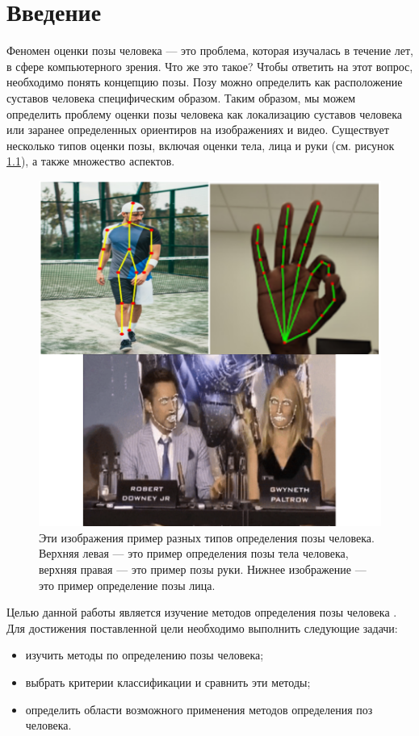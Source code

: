 
\chapter{Введение}


Феномен оценки позы человека --- это проблема, которая изучалась в течение лет, в сфере компьютерного зрения. Что же это такое? Чтобы ответить на этот вопрос, необходимо понять концепцию позы. Позу можно определить как расположение суставов человека специфическим образом. Таким образом, мы можем определить проблему оценки позы человека как локализацию суставов человека или заранее определенных ориентиров на изображениях и видео. Существует несколько типов оценки позы, включая оценки тела, лица и руки (см. рисунок \ref{img:human,hand,face}), а также множество аспектов.

\begin{figure}[ht!]
	\centering
	\includegraphics[width=0.96\linewidth]{assets/thefirst.png}
	\caption{Эти изображения пример разных типов определения позы человека. Верхняя левая --- это пример определения позы тела человека, верхняя правая --- это пример позы руки. Нижнее изображение --- это пример определение позы лица.}
	\label{img:human,hand,face}
\end{figure}


Целью данной работы является изучение методов определения позы человека \cite{guide-hpe}. Для достижения поставленной цели необходимо выполнить следующие задачи:
\begin{itemize}
	\item изучить методы по определению позы человека;
	\item выбрать критерии классификации и сравнить эти методы;
	\item определить области возможного применения методов определения поз человека.
\end{itemize}